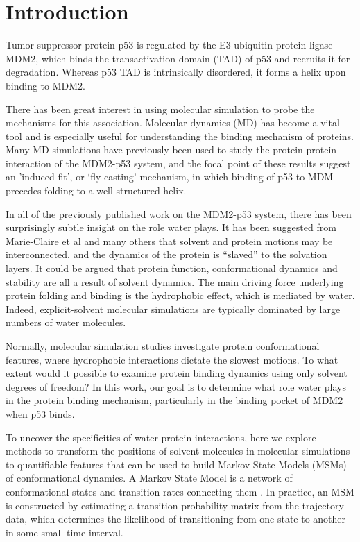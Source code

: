 
\section{Introduction}


Tumor suppressor protein p53 is regulated by the E3 ubiquitin-protein
ligase MDM2, which binds the transactivation domain (TAD) of p53 and
recruits it for degradation. Whereas p53 TAD is intrinsically
disordered, it forms a helix upon binding to MDM2.

There has been great interest in using molecular simulation to probe the
mechanisms for this association. Molecular dynamics (MD) has become a
vital tool and is especially useful for understanding the binding
mechanism of proteins. Many MD simulations have previously been used to
study the protein-protein interaction of the MDM2-p53 system, and the
focal point of these results suggest an 'induced-fit', or `fly-casting'
mechanism, in which binding of p53 to MDM precedes folding to a
well-structured helix.

In all of the previously published work on the MDM2-p53 system, there
has been surprisingly subtle insight on the role water plays. It has
been suggested from Marie-Claire et al \cite{bellissent2016water} and many others \cite{spyrakis2017roles,yang2013approaches} that
solvent and protein motions may be interconnected, and the dynamics of
the protein is ``slaved'' to the solvation layers. It could be argued
that protein function, conformational dynamics and stability are all a
result of solvent dynamics. The main driving force underlying protein
folding and binding is the hydrophobic effect, which is mediated by
water. Indeed, explicit-solvent molecular simulations are typically
dominated by large numbers of water molecules.

Normally, molecular simulation studies investigate protein
conformational features, where hydrophobic interactions dictate the
slowest motions. To what extent would it possible to examine protein
binding dynamics using only solvent degrees of freedom? In this work,
our goal is to determine what role water plays in the protein binding
mechanism, particularly in the binding pocket of MDM2 when p53 binds.

To uncover the specificities of water-protein interactions, here we
explore methods to transform the positions of solvent molecules in
molecular simulations to quantifiable features that can be used to build
Markov State Models (MSMs) of conformational dynamics. A Markov State
Model is a network of conformational states and transition rates
connecting them \cite{schwantes2014perspective,bowman2013introduction}. In practice, an MSM is constructed by
estimating a transition probability matrix from the trajectory data,
which determines the likelihood of transitioning from one state to
another in some small time interval.

